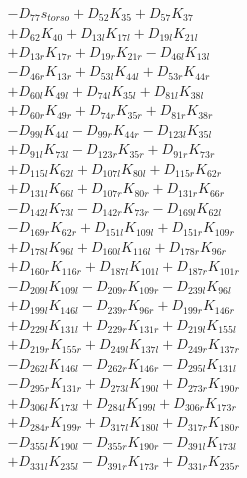 \begin{multicols}{2}
\begin{align}
&- D_{77}s_{torso} + D_{52}K_{35} + D_{57}K_{37}  \nonumber \\
&+ D_{62}K_{40} + D_{13l}K_{17l} + D_{19l}K_{21l}  \nonumber \\
&+ D_{13r}K_{17r} + D_{19r}K_{21r} - D_{46l}K_{13l}  \nonumber \\
&- D_{46r}K_{13r} + D_{53l}K_{44l} + D_{53r}K_{44r}  \nonumber \\
&+ D_{60l}K_{49l} + D_{74l}K_{35l} + D_{81l}K_{38l}  \nonumber \\
&+ D_{60r}K_{49r} + D_{74r}K_{35r} + D_{81r}K_{38r}  \nonumber \\
&- D_{99l}K_{44l} - D_{99r}K_{44r} - D_{123l}K_{35l}  \nonumber \\
&+ D_{91l}K_{73l} - D_{123r}K_{35r} + D_{91r}K_{73r}  \nonumber \\
&+ D_{115l}K_{62l} + D_{107l}K_{80l} + D_{115r}K_{62r}  \nonumber \\
&+ D_{131l}K_{66l} + D_{107r}K_{80r} + D_{131r}K_{66r}  \nonumber \\
&- D_{142l}K_{73l} - D_{142r}K_{73r} - D_{169l}K_{62l}  \nonumber \\
&- D_{169r}K_{62r} + D_{151l}K_{109l} + D_{151r}K_{109r}  \nonumber \\
&+ D_{178l}K_{96l} + D_{160l}K_{116l} + D_{178r}K_{96r}  \nonumber \\
&+ D_{160r}K_{116r} + D_{187l}K_{101l} + D_{187r}K_{101r}  \nonumber \\
&- D_{209l}K_{109l} - D_{209r}K_{109r} - D_{239l}K_{96l}  \nonumber \\
&+ D_{199l}K_{146l} - D_{239r}K_{96r} + D_{199r}K_{146r}  \nonumber \\
&+ D_{229l}K_{131l} + D_{229r}K_{131r} + D_{219l}K_{155l}  \nonumber \\
&+ D_{219r}K_{155r} + D_{249l}K_{137l} + D_{249r}K_{137r}  \nonumber \\
&- D_{262l}K_{146l} - D_{262r}K_{146r} - D_{295l}K_{131l}  \nonumber \\
&- D_{295r}K_{131r} + D_{273l}K_{190l} + D_{273r}K_{190r}  \nonumber \\
&+ D_{306l}K_{173l} + D_{284l}K_{199l} + D_{306r}K_{173r}  \nonumber \\
&+ D_{284r}K_{199r} + D_{317l}K_{180l} + D_{317r}K_{180r}  \nonumber \\
&- D_{355l}K_{190l} - D_{355r}K_{190r} - D_{391l}K_{173l}  \nonumber \\
&+ D_{331l}K_{235l} - D_{391r}K_{173r} + D_{331r}K_{235r}  \nonumber \\

\end{align}
\end{multicols}
